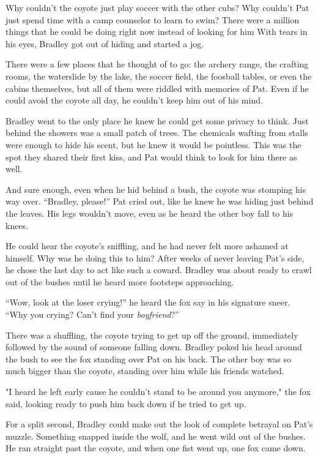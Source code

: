 Why couldn't the coyote just play soccer with the other cubs? Why
couldn't Pat just spend time with a camp counselor to learn to swim?
There were a million things that he could be doing right now instead of
looking for him With tears in his eyes, Bradley got out of hiding and
started a jog.

There were a few places that he thought of to go: the archery range, the
crafting rooms, the waterslide by the lake, the soccer field, the
foosball tables, or even the cabins themselves, but all of them were
riddled with memories of Pat. Even if he could avoid the coyote all day,
he couldn't keep him out of his mind.

Bradley went to the only place he knew he could get some privacy to
think. Just behind the showers was a small patch of trees. The chemicals
wafting from stalls were enough to hide his scent, but he knew it would
be pointless. This was the spot they shared their first kiss, and Pat
would think to look for him there as well.

And sure enough, even when he hid behind a bush, the coyote was stomping
his way over. ``Bradley, please!'' Pat cried out, like he knew he was
hiding just behind the leaves. His legs wouldn't move, even as he heard
the other boy fall to his knees.

He could hear the coyote's sniffling, and he had never felt more ashamed
at himself. Why was he doing this to him? After weeks of never leaving
Pat's side, he chose the last day to act like such a coward. Bradley was
about ready to crawl out of the bushes until he heard more footsteps
approaching.

``Wow, look at the loser crying!'' he heard the fox say in his signature
sneer. ``Why you crying? Can't find your \emph{boyfriend}?''

There was a shuffling, the coyote trying to get up off the ground,
immediately followed by the sound of someone falling down. Bradley poked
his head around the bush to see the fox standing over Pat on his back.
The other boy was so much bigger than the coyote, standing over him
while his friends watched.

"I heard he left early cause he couldn't stand to be around you
anymore," the fox said, looking ready to push him back down if he tried
to get up.

For a split second, Bradley could make out the look of complete betrayal
on Pat's muzzle. Something snapped inside the wolf, and he went wild out
of the bushes. He ran straight past the coyote, and when one fist went
up, one fox came down.

